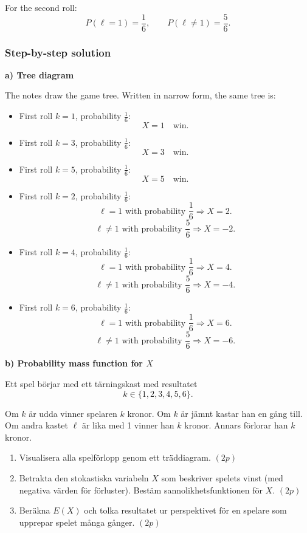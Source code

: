 \documentclass[10pt]{article}
\begin{document}
For the second roll:
\[
P(\ell=1)=\frac{1}{6},
\qquad
P(\ell\ne 1)=\frac{5}{6}.
\]

\subsubsection*{Step-by-step solution}

\textbf{a) Tree diagram}

The notes draw the game tree. Written in narrow form,
the same tree is:

\begin{itemize}
\item
First roll \(k=1\), probability \(\frac16\):
\[
X=1
\quad\text{win}.
\]

\item
First roll \(k=3\), probability \(\frac16\):
\[
X=3
\quad\text{win}.
\]

\item
First roll \(k=5\), probability \(\frac16\):
\[
X=5
\quad\text{win}.
\]

\item
First roll \(k=2\), probability \(\frac16\):
\[
\ell=1
\text{ with probability }\frac16
\Rightarrow X=2.
\]
\[
\ell\ne 1
\text{ with probability }\frac56
\Rightarrow X=-2.
\]

\item
First roll \(k=4\), probability \(\frac16\):
\[
\ell=1
\text{ with probability }\frac16
\Rightarrow X=4.
\]
\[
\ell\ne 1
\text{ with probability }\frac56
\Rightarrow X=-4.
\]

\item
First roll \(k=6\), probability \(\frac16\):
\[
\ell=1
\text{ with probability }\frac16
\Rightarrow X=6.
\]
\[
\ell\ne 1
\text{ with probability }\frac56
\Rightarrow X=-6.
\]
\end{itemize}

\textbf{b) Probability mass function for \(X\)}

Ett spel börjar med ett tärningskast med resultatet
\[
k\in \{1,2,3,4,5,6\}.
\]

Om \(k\) är udda vinner spelaren \(k\) kronor.
Om \(k\) är jämnt kastar han en gång till.
Om andra kastet \(\ell\) är lika med 1 vinner han
\(k\) kronor. Annars förlorar han \(k\) kronor.

\begin{enumerate}[label=\alph*)]
\item Visualisera alla spelförlopp genom ett
träddiagram. \((2p)\)

\item Betrakta den stokastiska variabeln \(X\) som
beskriver spelets vinst (med negativa värden för
förluster). Bestäm sannolikhetsfunktionen för \(X\).
\((2p)\)

\item Beräkna \(E(X)\) och tolka resultatet ur
perspektivet för en spelare som upprepar spelet
många gånger. \((2p)\)
\end{enumerate}
\end{document}
